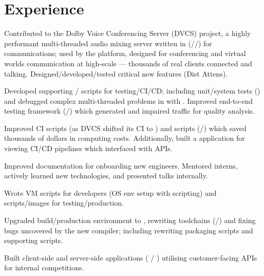\documentclass[a4paper]{resume}
\begin{document}
%
\begin{minipage}[t]{0.66\textwidth} %
	\section{Experience}
	\smallsectionspace{}

	\vspace{\topsep} %
	\begin{tightitemize}
		\item {
		            Contributed to the Dolby Voice Conferencing Server (DVCS) project, a highly performant multi-threaded
		            audio mixing server written in \cpp{} (\cppstd{}/\conan{}/\cmake{}) for \voip{} communications; used
		            by the \dolbyio{} platform, designed for conferencing and virtual worlds communication at high-scale
		            --- thousands of real clients connected and talking. Designed/developed/tested critical new features
		            (Dist Attens).
		      }
		\item {
		            Developed supporting \python{}/\bash{} scripts for testing/CI/CD; including unit/system tests
		            (\googletest{}) and debugged complex multi-threaded problems in \cpp{} with \gdb{}. Improved \oats{}
		            end-to-end testing framework (\python{}/\asyncio{}) which generated \rtp{} and impaired traffic for
		            quality analysis.
		      }
		\item {
		            Improved CI scripts (as DVCS shifted its CI to \gitlab) and \aws{} scripts (\python/\boto) which
		            saved thousands of dollars in \ectwo{} computing costs. Additionally, built a \nodejs{}
		            \typescript{} application for viewing CI/CD pipelines which interfaced with \gitlab{} \rest{} APIs.
		      }
		\item {
		            Improved documentation for onboarding new engineers. Mentored interns, actively learned new technologies,
		            and presented talks internally.
		      }
		\item {
		            Wrote \vagrant{} VM scripts for developers (OS env setup with \bash{} scripting) and \docker{} scripts/images
		            for testing/production.
		      }
		\item {
		            Upgraded build/production environment to \debian{}, rewriting toolchains (\conan{}/\cmake{}) and fixing bugs
		            uncovered by the new compiler; including rewriting packaging scripts and supporting \python scripts.
		      }
		\item {
		            Built client-side and server-side applications (\nodejs{} \typescript{}/ \javascript{}) utilising
		            customer-facing APIs for internal competitions.
		      }
	\end{tightitemize}
	\smallsectionspace{}


\end{minipage}
\end{document}
